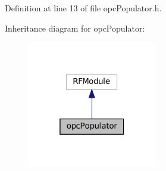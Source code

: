 Definition at line 13 of file opc\+Populator.\+h.



Inheritance diagram for opc\+Populator\+:
\nopagebreak
\begin{figure}[H]
\begin{center}
\leavevmode
\includegraphics[width=160pt]{classopcPopulator__inherit__graph}
\end{center}
\end{figure}
